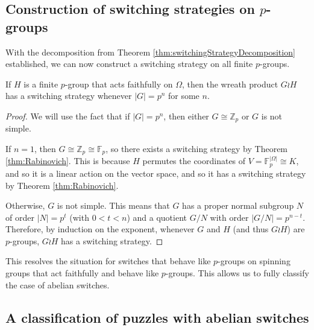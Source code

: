 \subsection{Construction of switching strategies on \texorpdfstring{$p$}{p}-groups}
With the decomposition from Theorem \ref{thm:switchingStrategyDecomposition}
established, we can now construct a switching strategy on all finite $p$-groups.

\begin{theorem}
  If $H$ is a finite $p$-group that acts faithfully on $\Omega$,
  then the wreath product
  $G \wr H$ has a switching strategy whenever $|G| = p^n$ for some $n$.
  \label{thm:pGroupStrategy}
\end{theorem}
\begin{proof}
  We will use the fact that if $|G| = p^n$,
  then either $G \cong \mathbb{Z}_p$ or $G$ is not simple.

  If $n = 1$, then $G \cong \mathbb{Z}_p \cong \mathbb F_p$, so there exists a
  switching strategy by Theorem \ref{thm:Rabinovich}. This is because $H$
  permutes the coordinates of $V = \mathbb F_p^{|\Omega|} \cong K$, and so it is a
  linear action on the vector space, and so it has a switching strategy by
  Theorem \ref{thm:Rabinovich}.

  Otherwise, $G$ is not simple. This means that $G$ has a proper normal subgroup
  $N$ of order $|N| = p^t$ (with $0 < t < n$)
  and a quotient $G/N$ with order $|G/N| = p^{n-t}$.
  Therefore, by induction on the exponent,
  whenever $G$ and $H$ (and thus $G \wr H$) are $p$-groups,
  $G \wr H$ has a switching strategy.
\end{proof}

This resolves the situation for switches that behave like $p$-groups on
spinning groups that act faithfully and behave like $p$-groups. This allows us
to fully classify the case of abelian switches.

\subsection{A classification of puzzles with abelian switches}

